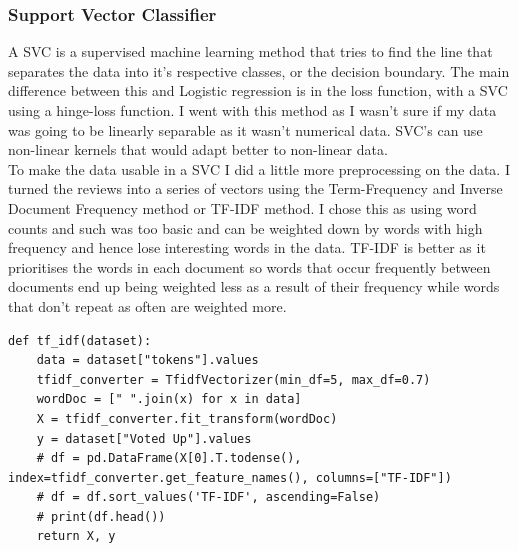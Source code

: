 \documentclass[11pt]{article} %
\begin{document}
\subsubsection{Support Vector Classifier}
A SVC is a supervised machine learning method that tries to find the line that separates the data into it's respective classes,  or the decision boundary.  The main difference between this and Logistic regression is in the loss function, with a SVC using a hinge-loss function.  I went with this method as I wasn't sure if my data was going to be linearly separable as it wasn't numerical data.  SVC's can use non-linear kernels that would adapt better to non-linear data. 
\\ To make the data usable in a SVC  I did a little more preprocessing on the data.  I turned the reviews into a series of vectors using the Term-Frequency and Inverse Document Frequency method or TF-IDF method.  I chose this as using word counts and such was too basic and can be weighted down by words with high frequency and hence lose interesting words in the data.  TF-IDF is better as it prioritises the words in each document so words that occur frequently between documents end up being weighted less as a result of their frequency while words that don't repeat as often are weighted more. 
\begin{verbatim}
def tf_idf(dataset):
    data = dataset["tokens"].values
    tfidf_converter = TfidfVectorizer(min_df=5, max_df=0.7)
    wordDoc = [" ".join(x) for x in data]
    X = tfidf_converter.fit_transform(wordDoc)
    y = dataset["Voted Up"].values
    # df = pd.DataFrame(X[0].T.todense(), index=tfidf_converter.get_feature_names(), columns=["TF-IDF"])
    # df = df.sort_values('TF-IDF', ascending=False)
    # print(df.head())
    return X, y
\end{verbatim}
\end{document}
